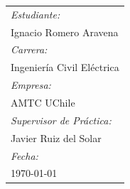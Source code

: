 \begin{titlepage}
\begin{minipage}{.5\textwidth}
\begin{flushright}
\begin{tabular}{l}
				\emph{Estudiante:}\\
				{\small Ignacio Romero Aravena}\\[.2cm]
				
				\emph{Carrera:} \\ 
				{\small Ingeniería Civil Eléctrica}\\[0.2 cm]
				
				\emph{Empresa:} \\
				{\small AMTC UChile}\\[.2cm]
					
					\emph{Supervisor de Práctica:} \\
					{\small Javier Ruiz del Solar}\\[.2cm]
					
					\emph{Fecha:}\\
					{\small \today}
				\end{tabular}
			\end{flushright}
		\end{minipage}
	\end{titlepage}
	
	
	
